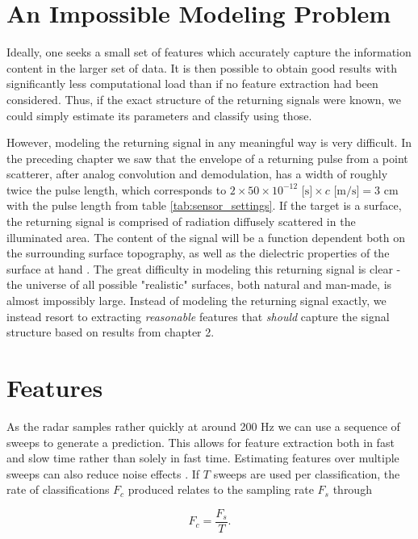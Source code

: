 \section{An Impossible Modeling Problem}\label{sec:chall}

Ideally, one seeks a small set of features which accurately capture the information content in the larger set of data. It is then possible to obtain good results with significantly less computational load than if no feature extraction had been considered. Thus, if the exact structure of the returning signals were known, we could simply estimate its parameters and classify using those.

However, modeling the returning signal in any meaningful way is very difficult. In the preceding chapter we saw that the envelope of a returning pulse from a point scatterer, after analog convolution and demodulation, has a width of roughly twice the pulse length, which corresponds to $2\times50\times 10^{-12}\text{ [s]}\times c \text{ [m/s]}= 3$ cm with the pulse length from table \ref{tab:sensor_settings}. If the target is a surface, the returning signal is comprised of radiation diffusely scattered in the illuminated area. The content of the signal will be a function dependent both on the surrounding surface topography, as well as the dielectric properties of the surface at hand \citep{grossman_popovic_chamberlin_gordon_novotny_2017}. The great difficulty in modeling this returning signal is clear - the universe of all possible "realistic" surfaces, both natural and man-made, is almost impossibly large. Instead of modeling the returning signal exactly, we instead resort to extracting \emph{reasonable} features that \emph{should} capture the signal structure based on results from chapter 2.  

\section{Features}

As the radar samples rather quickly at around 200 Hz we can use a sequence of sweeps to generate a prediction. This allows for feature extraction both in fast and slow time rather than solely in fast time. Estimating features over multiple sweeps can also reduce noise effects \citep{w_doerry_2016}. If $T$ sweeps are used per classification, the rate of classifications $F_c$ produced relates to the sampling rate $F_s$ through

\begin{equation}
	\label{eq:classification_rate}
	F_c = \frac{F_s}{T}.
\end{equation} 

